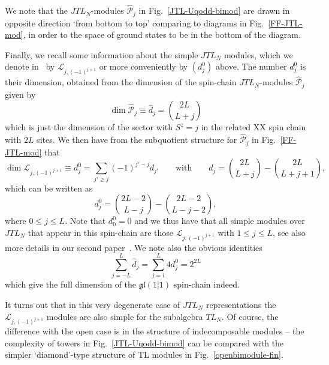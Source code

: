 \documentclass[11pt]{article}
\newcommand{\TL}[1]{TL_{#1}}
\newcommand{\JTL}[1]{JTL_{#1}}
\newcommand{\gl}{\mathfrak{gl}}
\newcommand{\TLX}{d^0}
\newcommand{\AIrrTL}[2]{\mathscr{L}_{#1,#2}}
\newcommand{\APrTL}[1]{\widehat{\mathscr{P}}_{#1}}
\theoremstyle{definition}
\begin{document}
 We note that the $\JTL{N}$-modules $\APrTL{j}$ in
Fig.~\ref{JTL-Uqodd-bimod} are drawn in opposite direction `from
bottom to top' comparing to diagrams in Fig.~\ref{FF-JTL-mod}, in
order to  the space of ground states to be in the bottom of the diagram.


Finally, we recall some information about the simple $\JTL{N}$
modules, which we denote in~\cite{GRS2} by $\AIrrTL{j}{(-1)^{j+1}}$ or more
conveniently by $(\TLX_{j})$ above. The number $d_j^0$ is their dimension,
obtained from the dimension of the spin-chain $\JTL{N}$-modules $\APrTL{j}$
given by
%
\begin{equation}
\dim \APrTL{j} \equiv \widehat{d}_j=\binom{2L}{L+j}
\end{equation}
%
which is just the dimension of the sector with $S^z=j$ in the related
  XX spin chain with $2L$ sites. We  then have from the subquotient
  structure for $\APrTL{j}$ in Fig.~\ref{FF-JTL-mod} that
\begin{equation*}
\dim \AIrrTL{j}{(-1)^{j+1}} \equiv d_j^0=\sum_{j'\geq j} (-1)^{j'-j}d_{j'}\qquad
\text{with}\qquad d_j = \binom{2L}{L+j} -  \binom{2L}{L+j+1},
\end{equation*}
%
which can be written as
%
\begin{equation}\label{dim-irr-per}
d_j^0=
\binom{2L-2}{L-j}-
\binom{2L-2}{L-j-2},
\end{equation}
where $0\leq j\leq L$. Note that $d_0^0=0$ and we thus have that all simple modules over $\JTL{N}$ that appear in this spin-chain are those $\AIrrTL{j}{(-1)^{j+1}}$ with $1\leq j\leq L$, see also more details in our second paper~\cite{GRS2}.
%
We note also the obvious identities
%
\begin{equation*}
\sum_{j=-L}^L \widehat{d}_j=\sum_{j=1}^L 4d_j^0=2^{2L}
\end{equation*}
%
which give the full dimension of the $\gl(1|1)$ spin-chain indeed.

It turns out that in this very degenerate case of $\JTL{N}$ representations the $\AIrrTL{j}{(-1)^{j+1}}$ modules are also simple for the subalgebra $\TL{N}$. Of course, the difference with the open case is in the structure of indecomposable modules -- the complexity of towers in Fig.~\ref{JTL-Uqodd-bimod} can be compared with the simpler `diamond'-type structure of TL modules in Fig.~\ref{openbimodule-fin}.
\end{document}
